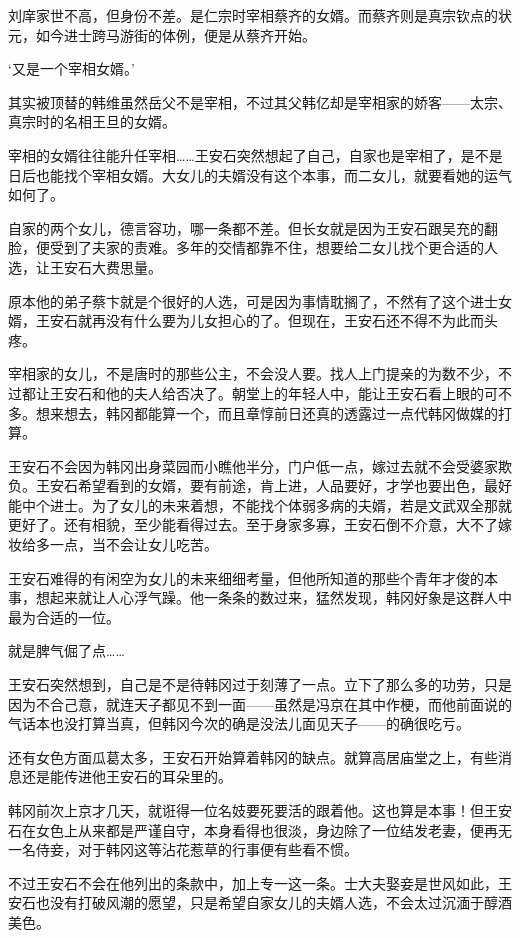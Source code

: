 刘庠家世不高，但身份不差。是仁宗时宰相蔡齐的女婿。而蔡齐则是真宗钦点的状元，如今进士跨马游街的体例，便是从蔡齐开始。

‘又是一个宰相女婿。’

其实被顶替的韩维虽然岳父不是宰相，不过其父韩亿却是宰相家的娇客——太宗、真宗时的名相王旦的女婿。

宰相的女婿往往能升任宰相……王安石突然想起了自己，自家也是宰相了，是不是日后也能找个宰相女婿。大女儿的夫婿没有这个本事，而二女儿，就要看她的运气如何了。

自家的两个女儿，德言容功，哪一条都不差。但长女就是因为王安石跟吴充的翻脸，便受到了夫家的责难。多年的交情都靠不住，想要给二女儿找个更合适的人选，让王安石大费思量。

原本他的弟子蔡卞就是个很好的人选，可是因为事情耽搁了，不然有了这个进士女婿，王安石就再没有什么要为儿女担心的了。但现在，王安石还不得不为此而头疼。

宰相家的女儿，不是唐时的那些公主，不会没人要。找人上门提亲的为数不少，不过都让王安石和他的夫人给否决了。朝堂上的年轻人中，能让王安石看上眼的可不多。想来想去，韩冈都能算一个，而且章惇前日还真的透露过一点代韩冈做媒的打算。

王安石不会因为韩冈出身菜园而小瞧他半分，门户低一点，嫁过去就不会受婆家欺负。王安石希望看到的女婿，要有前途，肯上进，人品要好，才学也要出色，最好能中个进士。为了女儿的未来着想，不能找个体弱多病的夫婿，若是文武双全那就更好了。还有相貌，至少能看得过去。至于身家多寡，王安石倒不介意，大不了嫁妆给多一点，当不会让女儿吃苦。

王安石难得的有闲空为女儿的未来细细考量，但他所知道的那些个青年才俊的本事，想起来就让人心浮气躁。他一条条的数过来，猛然发现，韩冈好象是这群人中最为合适的一位。

就是脾气倔了点……

王安石突然想到，自己是不是待韩冈过于刻薄了一点。立下了那么多的功劳，只是因为不合己意，就连天子都见不到一面——虽然是冯京在其中作梗，而他前面说的气话本也没打算当真，但韩冈今次的确是没法儿面见天子——的确很吃亏。

还有女色方面瓜葛太多，王安石开始算着韩冈的缺点。就算高居庙堂之上，有些消息还是能传进他王安石的耳朵里的。

韩冈前次上京才几天，就诳得一位名妓要死要活的跟着他。这也算是本事！但王安石在女色上从来都是严谨自守，本身看得也很淡，身边除了一位结发老妻，便再无一名侍妾，对于韩冈这等沾花惹草的行事便有些看不惯。

不过王安石不会在他列出的条款中，加上专一这一条。士大夫娶妾是世风如此，王安石也没有打破风潮的愿望，只是希望自家女儿的夫婿人选，不会太过沉湎于醇酒美色。

